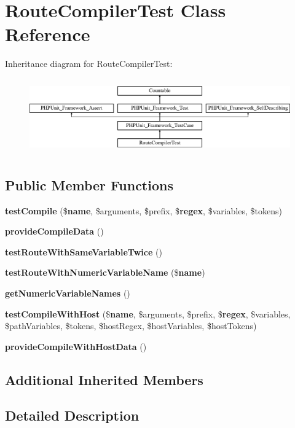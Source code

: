\section{Route\+Compiler\+Test Class Reference}
\label{class_symfony_1_1_component_1_1_routing_1_1_tests_1_1_route_compiler_test}
Inheritance diagram for Route\+Compiler\+Test\+:\begin{figure}[H]
\begin{center}
\leavevmode
\includegraphics[height=3.303835cm]{class_symfony_1_1_component_1_1_routing_1_1_tests_1_1_route_compiler_test}
\end{center}
\end{figure}
\subsection*{Public Member Functions}
\begin{DoxyCompactItemize}
\item 
{\bf test\+Compile} (\${\bf name}, \$arguments, \$prefix, \${\bf regex}, \$variables, \$tokens)
\item 
{\bf provide\+Compile\+Data} ()
\item 
{\bf test\+Route\+With\+Same\+Variable\+Twice} ()
\item 
{\bf test\+Route\+With\+Numeric\+Variable\+Name} (\${\bf name})
\item 
{\bf get\+Numeric\+Variable\+Names} ()
\item 
{\bf test\+Compile\+With\+Host} (\${\bf name}, \$arguments, \$prefix, \${\bf regex}, \$variables, \$path\+Variables, \$tokens, \$host\+Regex, \$host\+Variables, \$host\+Tokens)
\item 
{\bf provide\+Compile\+With\+Host\+Data} ()
\end{DoxyCompactItemize}
\subsection*{Additional Inherited Members}


\subsection{Detailed Description}



